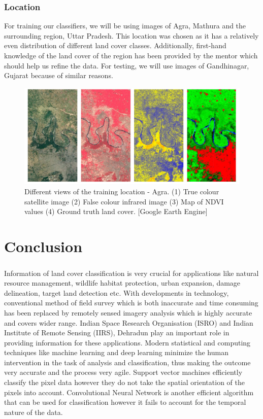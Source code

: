\documentclass[12pt, a4paper]{report}
\begin{document}
\subsection{Location}
For training our classifiers, we will be using images of Agra, Mathura and the surrounding region, Uttar Pradesh. This location was chosen as it has a relatively even distribution of different land cover classes. Additionally, first-hand knowledge of the land cover of the region has been provided by the mentor which should help us refine the data. For testing, we will use images of Gandhinagar, Gujarat because of similar reasons.
\begin{figure}[h]
\centering
\includegraphics[width=\textwidth]{agra.jpg}
\caption{Different views of the training location - Agra. (1) True colour satellite image (2) False colour infrared image (3) Map of NDVI values (4) Ground truth land cover. [Google Earth Engine]}
\end{figure}
\chapter{Conclusion}
\paragraph{}
Information of land cover classification is very crucial for applications like natural resource management, wildlife habitat protection, urban expansion, damage delineation, target land detection etc. With developments in technology, conventional method of field survey which is both inaccurate and time consuming has been replaced by remotely sensed imagery analysis which is highly accurate and covers wider range. Indian Space Research Organisation (ISRO) and Indian Institute of Remote Sensing (IIRS), Dehradun play an important role in providing information for these applications. Modern statistical and computing techniques like machine learning and deep learning minimize the human intervention in the task of analysis and classification, thus making the outcome very accurate and the process very agile. Support vector machines efficiently classify the pixel data however they do not take the spatial orientation of the pixels into account. Convolutional Neural Network is another efficient algorithm that can be used for classification however it fails to account for the temporal nature of the data.

\printbibliography[heading=bibintoc, title={References}]
\end{document}
